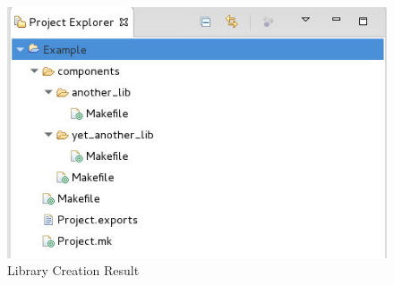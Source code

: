 \begin{flushleft}
\begin{figure}[h!]
  \centering
  \includegraphics[scale=0.5]{figures/libraryresult.jpg}
  \caption{Library Creation Result}
  \label{fig:figure5}
\end{figure}

\end{flushleft}

\newpage

